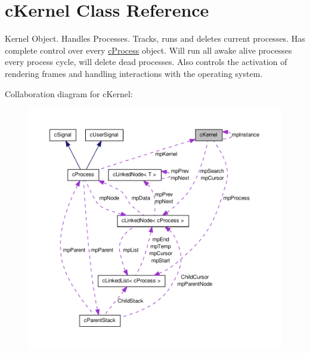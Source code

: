\hypertarget{classc_kernel}{
\section{cKernel Class Reference}
\label{classc_kernel}
}


Kernel Object. Handles Processes. Tracks, runs and deletes current processes. Has complete control over every \hyperlink{classc_process}{cProcess} object. Will run all awake alive processes every process cycle, will delete dead processes. Also controls the activation of rendering frames and handling interactions with the operating system.  




Collaboration diagram for cKernel:\nopagebreak
\begin{figure}[H]
\begin{center}
\leavevmode
\includegraphics[width=400pt]{classc_kernel__coll__graph}
\end{center}
\end{figure}
